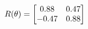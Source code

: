 \documentclass[preview]{standalone}
\begin{document}
\begin{align*}
\special{dvisvgm:raw <g id='unique000'>}R(\theta) = \begin{bmatrix}0.88 & 0.47\\-0.47 & 0.88\end{bmatrix}\special{dvisvgm:raw </g>}
\end{align*}
\end{document}
